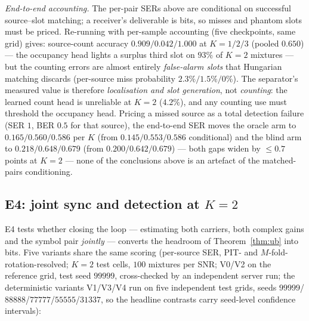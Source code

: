 \documentclass[journal]{IEEEtran}
\begin{document}
\emph{End-to-end accounting.} The per-pair SERs above are conditional
on successful source--slot matching; a receiver's deliverable is bits,
so misses and phantom slots must be priced. Re-running with per-sample
accounting (five checkpoints, same grid) gives:
source-count accuracy $0.909/0.042/1.000$ at $K{=}1/2/3$ (pooled
$0.650$) --- the occupancy head lights a surplus third slot on $93\%$
of $K{=}2$ mixtures --- but the counting errors are almost entirely
\emph{false-alarm slots} that Hungarian matching
discards (per-source miss probability $2.3\%/1.5\%/0\%$). The separator's measured value is
therefore \emph{localisation and slot generation}, not
\emph{counting}: the learned count head
is unreliable at $K{=}2$ ($4.2\%$), and any counting use must
threshold the occupancy head. Pricing a missed source as a total
detection failure (SER $1$, BER $0.5$ for that source), the
end-to-end SER moves the oracle arm to $0.165/0.560/0.586$ per $K$
(from $0.145/0.553/0.586$ conditional) and the blind arm to
$0.218/0.648/0.679$ (from $0.200/0.642/0.679$) --- both gaps widen by
$\leq 0.7$ points at $K{=}2$ --- none of the conclusions above is an
artefact of the matched-pairs conditioning.

\subsection{E4: joint sync and detection at \texorpdfstring{$K{=}2$}{K=2}}
\label{sec:e4}

E4 tests whether closing the loop --- estimating both carriers, both
complex gains and the symbol pair \emph{jointly} --- converts the
headroom of Theorem~\ref{thm:ub} into bits. Five variants share the
same scoring (per-source SER, PIT- and $M$-fold-rotation-resolved;
$K{=}2$ test cells, $100$ mixtures per SNR; V0/V2 on the reference
grid, test seed $99999$, cross-checked by an independent server run;
the deterministic variants V1/V3/V4 run on five independent test
grids, seeds $99999$/$88888$/$77777$/$55555$/$31337$, so the headline
contrasts carry seed-level confidence intervals):
\end{document}
